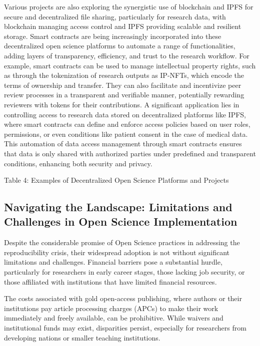 \documentclass{article}
\begin{document}
Various projects are also exploring the synergistic use of blockchain and IPFS for secure and decentralized file sharing, particularly for research data, with blockchain managing access control and IPFS providing scalable and resilient storage. Smart contracts are being increasingly incorporated into these decentralized open science platforms to automate a range of functionalities, adding layers of transparency, efficiency, and trust to the research workflow. For example, smart contracts can be used to manage intellectual property rights, such as through the tokenization of research outputs as IP-NFTs, which encode the terms of ownership and transfer. They can also facilitate and incentivize peer review processes in a transparent and verifiable manner, potentially rewarding reviewers with tokens for their contributions. A significant application lies in controlling access to research data stored on decentralized platforms like IPFS, where smart contracts can define and enforce access policies based on user roles, permissions, or even conditions like patient consent in the case of medical data. This automation of data access management through smart contracts ensures that data is only shared with authorized parties under predefined and transparent conditions, enhancing both security and privacy.

Table 4: Examples of Decentralized Open Science Platforms and Projects

\subsection{Navigating the Landscape: Limitations and Challenges in Open Science Implementation}

Despite the considerable promise of Open Science practices in addressing the reproducibility crisis, their widespread adoption is not without significant limitations and challenges. Financial barriers pose a substantial hurdle, particularly for researchers in early career stages, those lacking job security, or those affiliated with institutions that have limited financial resources.

The costs associated with gold open-access publishing, where authors or their institutions pay article processing charges (APCs) to make their work immediately and freely available, can be prohibitive. While waivers and institutional funds may exist, disparities persist, especially for researchers from developing nations or smaller teaching institutions.
\end{document}
